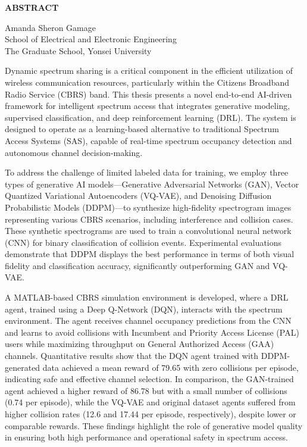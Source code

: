 \clearpage
\begin{centering}
\textbf{ABSTRACT}\\
\vspace{\baselineskip}
\end{centering}

\begin{flushright}
     Amanda Sheron Gamage \\
    School of Electrical and Electronic Engineering \\
    The Graduate School, Yonsei University
\end{flushright}

Dynamic spectrum sharing is a critical component in the efficient utilization of wireless communication resources, particularly within the Citizens Broadband Radio Service (CBRS) band. This thesis presents a novel end-to-end AI-driven framework for intelligent spectrum access that integrates generative modeling, supervised classification, and deep reinforcement learning (DRL). The system is designed to operate as a learning-based alternative to traditional Spectrum Access Systems (SAS), 
capable of real-time spectrum occupancy detection and autonomous channel decision-making.

To address the challenge of limited labeled data for training, we employ three types of generative AI models—Generative Adversarial Networks (GAN), 
Vector Quantized Variational Autoencoders (VQ-VAE), and Denoising Diffusion Probabilistic Models (DDPM)—to synthesize high-fidelity spectrogram images 
representing various CBRS scenarios, including interference and collision cases. These synthetic spectrograms are used to train a convolutional neural network (CNN) 
for binary classification of collision events. Experimental evaluations demonstrate that DDPM displays the best performance in terms of both visual fidelity 
and classification accuracy, significantly outperforming GAN and VQ-VAE.

A MATLAB-based CBRS simulation environment is developed, where a DRL agent, trained using a Deep Q-Network (DQN), interacts with the spectrum environment. 
The agent receives channel occupancy predictions from the CNN and learns to avoid collisions with Incumbent and Priority Access License (PAL) users while
 maximizing throughput on General Authorized Access (GAA) channels. Quantitative results show that the DQN agent trained with DDPM-generated data achieved 
 a mean reward of 79.65 with zero collisions per episode, indicating safe and effective channel selection. In comparison, the GAN-trained agent achieved a 
 higher reward of 86.78 but with a small number of collisions (0.74 per episode), while the VQ-VAE and original dataset agents suffered from higher collision 
 rates (12.6 and 17.44 per episode, respectively), despite lower or comparable rewards. These findings highlight the role of generative model quality in ensuring 
 both high performance and operational safety in spectrum access.

